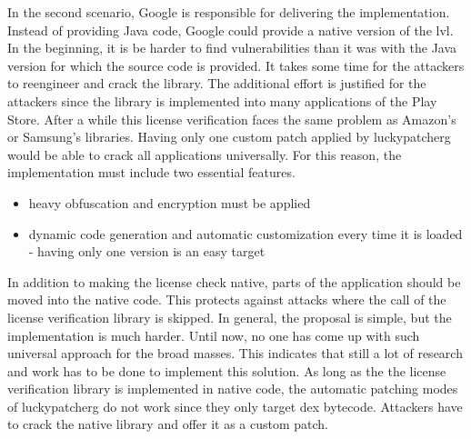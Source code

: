 \newline
In the second scenario, Google is responsible for delivering the implementation.
Instead of providing Java code, Google could provide a native version of the \gls{lvl}.
In the beginning, it is be harder to find vulnerabilities than it was with the Java version for which the source code is provided.
It takes some time for the attackers to reengineer and crack the library.
The additional effort is justified for the attackers since the library is implemented into many applications of the Play Store.
After a while this license verification faces the same problem as Amazon's or Samsung's libraries.
Having only one custom patch applied by \gls{luckypatcherg} would be able to crack all applications universally.
For this reason, the implementation must include two essential features.
\begin{itemize}
\item heavy obfuscation and encryption must be applied
\item dynamic code generation and automatic customization every time it is loaded - having only one version is an easy target
\end{itemize}
In addition to making the license check native, parts of the application should be moved into the native code.
This protects against attacks where the call of the license verification library is skipped.
\newline
\newline
In general, the proposal is simple, but the implementation is much harder.
Until now, no one has come up with such universal approach for the broad masses.
This indicates that still a lot of research and work has to be done to implement this solution.
\newline
As long as the the license verification library is implemented in native code, the automatic patching modes of \gls{luckypatcherg} do not work since they only target dex bytecode.
Attackers have to crack the native library and offer it as a custom patch.
